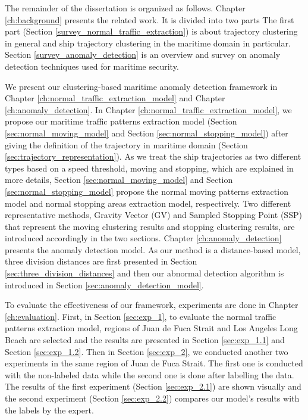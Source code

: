 \documentclass[12pt,glossary]{dalcsthesis}
\begin{document}
The remainder of the dissertation is organized as follows. %
Chapter \ref{ch:background} presents the related work. It is divided into two parts %
The first part (Section \ref{survey_normal_traffic_extraction}) is about trajectory clustering in general and ship trajectory clustering in the maritime domain in particular.  Section \ref{survey_anomaly_detection} is an overview and survey on anomaly detection techniques used for maritime security.

We present our clustering-based maritime anomaly detection framework in Chapter \ref{ch:normal_traffic_extraction_model} and Chapter \ref{ch:anomaly_detection}. In Chapter \ref{ch:normal_traffic_extraction_model}, we propose our maritime traffic patterns extraction model (Section \ref{sec:normal_moving_model} and Section \ref{sec:normal_stopping_model}) after giving the definition of the trajectory in maritime domain (Section \ref{sec:trajectory_representation}). As we treat the ship trajectories as two different types based on a speed threshold, moving and stopping, which are explained in more details, Section \ref{sec:normal_moving_model} and Section \ref{sec:normal_stopping_model} propose the normal moving patterns extraction model and normal stopping areas extraction model, respectively. Two different representative  methods, Gravity Vector (GV) and Sampled Stopping Point (SSP) that represent the moving clustering results and stopping clustering results, are introduced accordingly in the two sections. Chapter \ref{ch:anomaly_detection} presents the  anomaly detection model. As our method is a distance-based model, three division distances are first presented in Section \ref{sec:three_division_distances} and then our abnormal detection algorithm is introduced in Section \ref{sec:anomaly_detection_model}.

To evaluate the effectiveness of our framework,  experiments are done in Chapter \ref{ch:evaluation}. First, in Section \ref{sec:exp_1},  to evaluate the normal traffic patterns extraction model, regions of Juan de Fuca Strait and Los Angeles Long Beach are selected and the results are presented in Section \ref{sec:exp_1.1} and Section \ref{sec:exp_1.2}. Then in Section \ref{sec:exp_2}, we conducted another two experiments in the same region of Juan de Fuca Strait. The first one is conducted with the non-labeled data while the second one is done after labelling the data. The results of the first experiment (Section \ref{sec:exp_2.1}) are shown  visually  and  the  second  experiment (Section \ref{sec:exp_2.2}) compares our model's results with the labels by the expert. 
\end{document}
